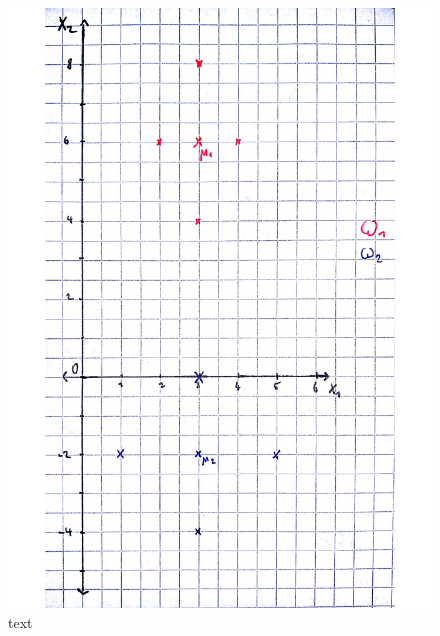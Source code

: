 \begin{figure}[b]
	\includegraphics[width=1\linewidth]{pointCloud2}
	\caption{text}
	\label{img:pointCloud}
\end{figure}
